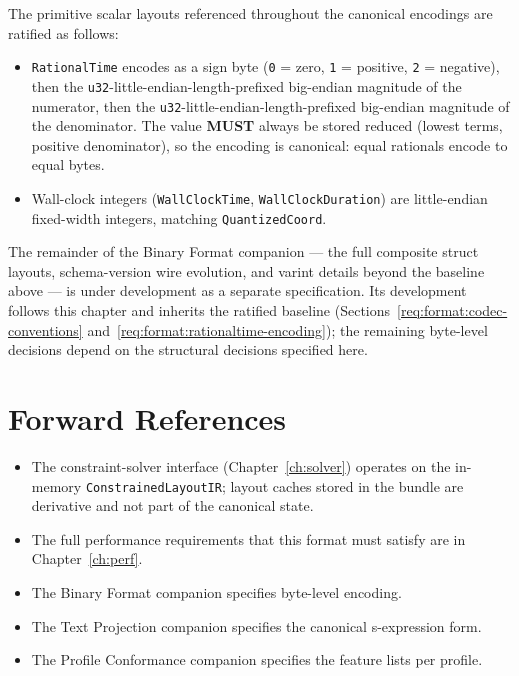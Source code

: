 \documentclass[11pt,letterpaper]{report}
\newcounter{requirement}[chapter]
\newcommand{\MUST}{\textbf{MUST}}
\begin{document}
\begin{requirement}
  \label{req:format:rationaltime-encoding}
  The primitive scalar layouts referenced throughout the canonical
  encodings are ratified as follows:
  \begin{itemize}
    \item \texttt{RationalTime} encodes as a sign byte
      (\texttt{0} = zero, \texttt{1} = positive, \texttt{2} =
      negative), then the \texttt{u32}-little-endian-length-prefixed
      big-endian magnitude of the numerator, then the
      \texttt{u32}-little-endian-length-prefixed big-endian magnitude
      of the denominator. The value \MUST{} always be stored reduced
      (lowest terms, positive denominator), so the encoding is
      canonical: equal rationals encode to equal bytes.
    \item Wall-clock integers (\texttt{WallClockTime},
      \texttt{WallClockDuration}) are little-endian fixed-width
      integers, matching \texttt{QuantizedCoord}.
  \end{itemize}
\end{requirement}

\begin{openquestion}
  The remainder of the Binary Format companion --- the full composite
  struct layouts, schema-version wire evolution, and varint details
  beyond the baseline above --- is under development as a separate
  specification. Its development follows this chapter and inherits the
  ratified baseline (Sections~\ref{req:format:codec-conventions}
  and~\ref{req:format:rationaltime-encoding}); the remaining byte-level
  decisions depend on the structural decisions specified here.
\end{openquestion}

\section{Forward References}

\begin{itemize}
  \item The constraint-solver interface (Chapter~\ref{ch:solver})
    operates on the in-memory \texttt{ConstrainedLayoutIR}; layout
    caches stored in the bundle are derivative and not part of the
    canonical state.
  \item The full performance requirements that this format must
    satisfy are in Chapter~\ref{ch:perf}.
  \item The Binary Format companion specifies byte-level encoding.
  \item The Text Projection companion specifies the canonical
    s-expression form.
  \item The Profile Conformance companion specifies the feature
    lists per profile.
\end{itemize}
\end{document}
